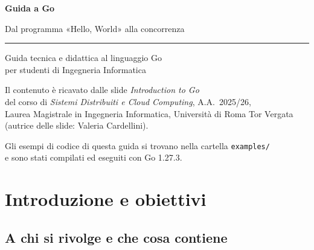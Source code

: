 \documentclass[11pt,a4paper]{report}
\begin{document}
\begin{titlepage}
\centering
\vspace*{2.2cm}
{\sffamily\bfseries\fontsize{40}{46}\selectfont\color{defcol} Guida a Go\par}
\vspace{0.6cm}
{\sffamily\Large Dal programma «Hello, World» alla concorrenza\par}
\vspace{1.2cm}
\rule{0.6\textwidth}{0.6pt}\par
\vspace{0.8cm}
{\large Guida tecnica e didattica al linguaggio Go\\[0.3em]
per studenti di Ingegneria Informatica\par}
\vspace{2.2cm}
\begin{minipage}{0.8\textwidth}
\centering
\small
Il contenuto è ricavato dalle slide \emph{Introduction to Go}\\
del corso di \emph{Sistemi Distribuiti e Cloud Computing}, A.A.\ 2025/26,\\
Laurea Magistrale in Ingegneria Informatica, Università di Roma Tor Vergata\\
(autrice delle slide: Valeria Cardellini).
\end{minipage}
\vfill
{\small Gli esempi di codice di questa guida si trovano nella cartella \texttt{examples/}\\
e sono stati compilati ed eseguiti con Go 1.27.3.\par}
\end{titlepage}

\tableofcontents
\clearpage
{}

\chapter*{Introduzione e obiettivi}

\section*{A chi si rivolge e che cosa contiene}
\end{document}
